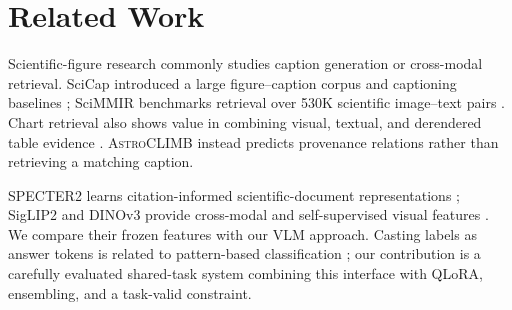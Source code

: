\documentclass[11pt]{article}
\newcommand{\task}{\textsc{AstroCLIMB}}
\begin{document}
\section{Related Work}

Scientific-figure research commonly studies caption generation or cross-modal retrieval.  SciCap introduced a large figure--caption corpus and captioning baselines \citep{hsu2021scicap}; SciMMIR benchmarks retrieval over 530K scientific image--text pairs \citep{wu2024scimmir}.  Chart retrieval also shows value in combining visual, textual, and derendered table evidence \citep{nowak2024chartretrieval}.  \task{} instead predicts provenance relations rather than retrieving a matching caption.

SPECTER2 learns citation-informed scientific-document representations \citep{cohan2020specter,singh2023scirepeval}; SigLIP2 and DINOv3 provide cross-modal and self-supervised visual features \citep{tschannen2025siglip2,simeoni2025dinov3}.  We compare their frozen features with our VLM approach.  Casting labels as answer tokens is related to pattern-based classification \citep{schick2021pet}; our contribution is a carefully evaluated shared-task system combining this interface with QLoRA, ensembling, and a task-valid constraint.
\end{document}

